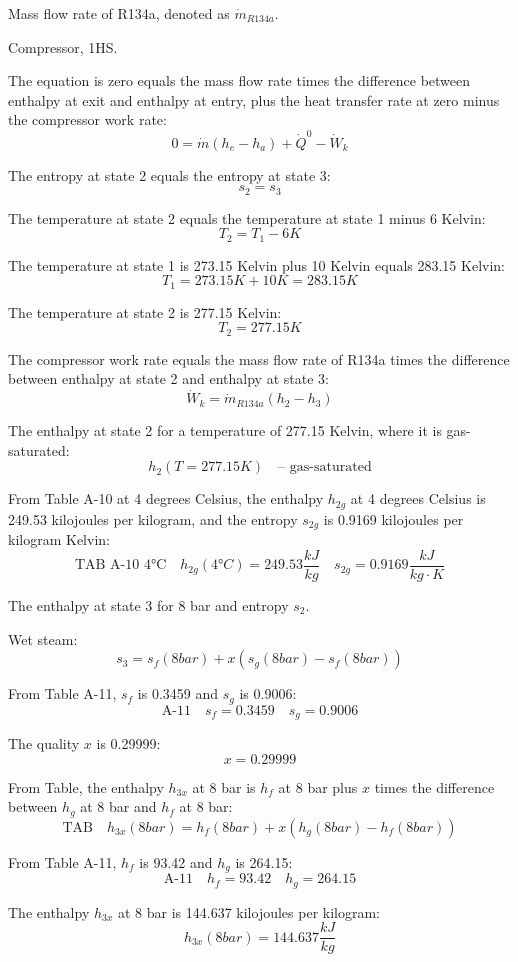 Mass flow rate of R134a, denoted as \( \dot{m}_{R134a} \).

Compressor, 1HS.

The equation is zero equals the mass flow rate times the difference between enthalpy at exit and enthalpy at entry, plus the heat transfer rate at zero minus the compressor work rate:
\[ 0 = \dot{m}(h_e - h_a) + \dot{Q}^0 - \dot{W}_k \]

The entropy at state 2 equals the entropy at state 3:
\[ s_2 = s_3 \]

The temperature at state 2 equals the temperature at state 1 minus 6 Kelvin:
\[ T_2 = T_1 - 6K \]

The temperature at state 1 is 273.15 Kelvin plus 10 Kelvin equals 283.15 Kelvin:
\[ T_1 = 273.15K + 10K = 283.15K \]

The temperature at state 2 is 277.15 Kelvin:
\[ T_2 = 277.15K \]

The compressor work rate equals the mass flow rate of R134a times the difference between enthalpy at state 2 and enthalpy at state 3:
\[ \dot{W}_k = \dot{m}_{R134a} (h_2 - h_3) \]

The enthalpy at state 2 for a temperature of 277.15 Kelvin, where it is gas-saturated:
\[ h_2 (T = 277.15K) \quad \text{-- gas-saturated} \]

From Table A-10 at 4 degrees Celsius, the enthalpy \( h_{2g} \) at 4 degrees Celsius is 249.53 kilojoules per kilogram, and the entropy \( s_{2g} \) is 0.9169 kilojoules per kilogram Kelvin:
\[ \text{TAB A-10 4°C} \quad h_{2g} (4°C) = 249.53 \frac{kJ}{kg} \quad s_{2g} = 0.9169 \frac{kJ}{kg \cdot K} \]

The enthalpy at state 3 for 8 bar and entropy \( s_2 \).

Wet steam:
\[ s_3 = s_f (8 bar) + x (s_g (8 bar) - s_f (8 bar)) \]

From Table A-11, \( s_f \) is 0.3459 and \( s_g \) is 0.9006:
\[ \text{A-11} \quad s_f = 0.3459 \quad s_g = 0.9006 \]

The quality \( x \) is 0.29999:
\[ x = 0.29999 \]

From Table, the enthalpy \( h_{3x} \) at 8 bar is \( h_f \) at 8 bar plus \( x \) times the difference between \( h_g \) at 8 bar and \( h_f \) at 8 bar:
\[ \text{TAB} \quad h_{3x} (8 bar) = h_f (8 bar) + x (h_g (8 bar) - h_f (8 bar)) \]

From Table A-11, \( h_f \) is 93.42 and \( h_g \) is 264.15:
\[ \text{A-11} \quad h_f = 93.42 \quad h_g = 264.15 \]

The enthalpy \( h_{3x} \) at 8 bar is 144.637 kilojoules per kilogram:
\[ h_{3x} (8 bar) = 144.637 \frac{kJ}{kg} \]

